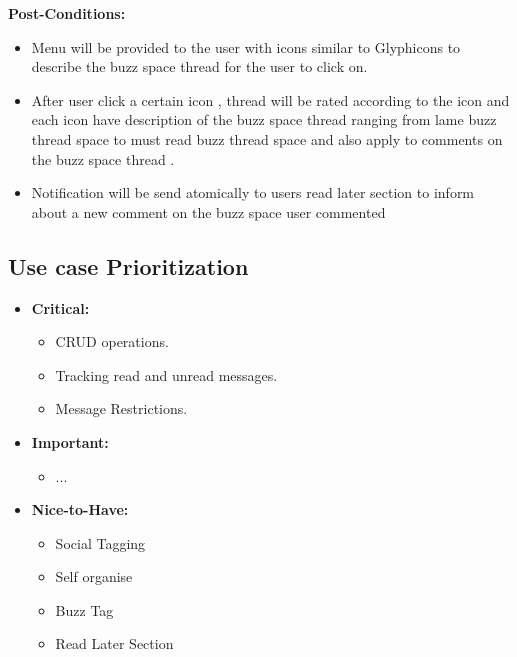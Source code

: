 \documentclass[11pt]{article}
\begin{document}
\begin{enumerate}
\begin{itemize}
\begin{itemize}
	\end{itemize}

\textbf{Post-Conditions: }
	\begin{itemize}
	\item Menu will be provided to the user with icons similar to Glyphicons
to describe the buzz space thread for the user to click on.
	\item After user click a certain icon , thread will be rated according to
the icon and each icon have description of the buzz space thread
ranging from lame buzz thread space to must read buzz thread
space and also apply to comments on the buzz space thread .
\item Notification will be send atomically to users read later section to
inform about a new comment on the buzz space user commented
	
	\end{itemize}
\end{itemize}


\end{enumerate}




\subsection{Use case Prioritization}
\begin{itemize}
\item \textbf{Critical: }
	\begin{itemize}
		\item CRUD operations.
		\item Tracking read and unread messages.
		\item Message Restrictions.
	\end{itemize}

\item \textbf{Important: }
	\begin{itemize}
		\item ...
	\end{itemize}

\item \textbf{Nice-to-Have: }
	\begin{itemize}
		\item Social Tagging
		\item Self organise
		\item Buzz Tag
		\item Read Later Section
	\end{itemize}
\end{itemize}
\end{document}
